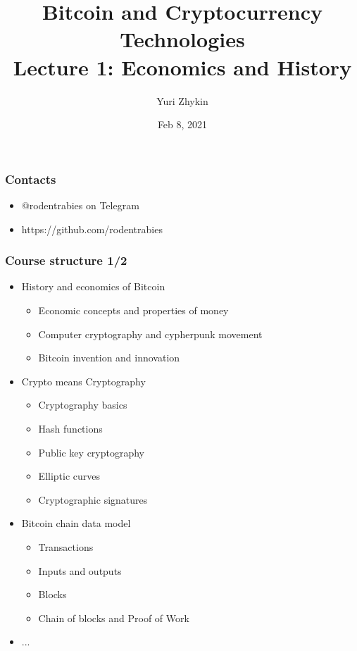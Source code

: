 \documentclass{beamer}
\title{
  Bitcoin and Cryptocurrency Technologies \\
  Lecture 1: Economics and History
}
\author{Yuri Zhykin}
\date{Feb 8, 2021}
\begin{document}
\frame{\titlepage}

\begin{frame}
  \frametitle{Contacts}
  \begin{itemize}
  \item @rodentrabies on Telegram
  \item https://github.com/rodentrabies
  \end{itemize}
\end{frame}

\begin{frame}
  \frametitle{Course structure 1/2}
  \begin{itemize}
  \item History and economics of Bitcoin
    \begin{itemize}
    \item Economic concepts and properties of money
    \item Computer cryptography and cypherpunk movement
    \item Bitcoin invention and innovation
    \end{itemize}
  \item Crypto means Cryptography
    \begin{itemize}
    \item Cryptography basics
    \item Hash functions
    \item Public key cryptography
    \item Elliptic curves
    \item Cryptographic signatures
    \end{itemize}
  \item Bitcoin chain data model
    \begin{itemize}
    \item Transactions
    \item Inputs and outputs
    \item Blocks
    \item Chain of blocks and Proof of Work
    \end{itemize}
  \item[] ...
  \end{itemize}
\end{frame}
\end{document}
